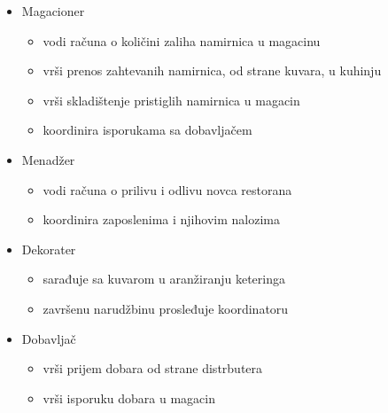 \begin{itemize}
\begin{itemize}
    \end{itemize}
    \item Magacioner
    \begin{itemize}
        \item vodi računa o količini zaliha namirnica u magacinu
        \item vrši prenos zahtevanih namirnica, od strane kuvara, u kuhinju
        \item vrši skladištenje pristiglih namirnica u magacin
        \item koordinira isporukama sa dobavljačem
    \end{itemize}
    \item Menadžer
    \begin{itemize}
        \item vodi računa o prilivu i odlivu novca restorana
        \item koordinira zaposlenima i njihovim nalozima
    \end{itemize}
    \item Dekorater
    \begin{itemize}
        \item sarađuje sa kuvarom u aranžiranju keteringa
        \item završenu narudžbinu prosleđuje koordinatoru
    \end{itemize}
    \item Dobavljač
    \begin{itemize}
        \item vrši prijem dobara od strane distrbutera
        \item vrši isporuku dobara u magacin
    \end{itemize}
\end{itemize}


